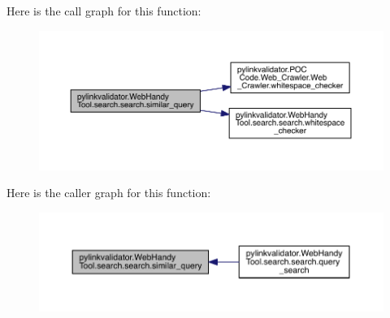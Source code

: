 Here is the call graph for this function\+:
\nopagebreak
\begin{figure}[H]
\begin{center}
\leavevmode
\includegraphics[width=350pt]{classpylinkvalidator_1_1_web_handy_tool_1_1search_1_1search_ad8279fa98fb80bfaae0800cd7c5fa21e_cgraph}
\end{center}
\end{figure}




Here is the caller graph for this function\+:
\nopagebreak
\begin{figure}[H]
\begin{center}
\leavevmode
\includegraphics[width=350pt]{classpylinkvalidator_1_1_web_handy_tool_1_1search_1_1search_ad8279fa98fb80bfaae0800cd7c5fa21e_icgraph}
\end{center}
\end{figure}



